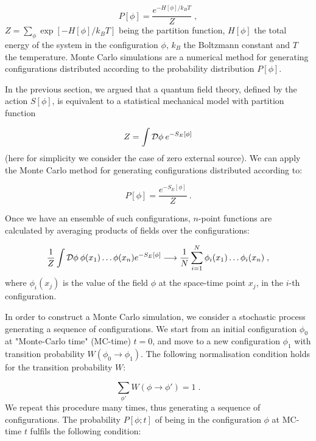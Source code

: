\begin{equation}
P[\phi] = \frac{e^{-H[\phi]/k_B T}}{Z} \; ,
\end{equation}
%
$Z=\sum_{\phi} \exp[-H[\phi]/k_B T]$ being the partition function, $H[\phi]$ the total energy of the system in the configuration $\phi$, $k_B$ the Boltzmann constant and $T$ the temperature. Monte Carlo simulations are a numerical method for generating configurations distributed according to the probability distribution $P[\phi]$.

In the previous section, we argued that a quantum field theory, defined by the action $
S[\phi]$, is equivalent to a statistical mechanical model with partition function

\begin{equation}
Z = \int \mathcal D \phi \: e^{- S_E[\phi]}
\end{equation}
%
(here for simplicity we consider the case of zero external source). We can apply the Monte Carlo method for generating configurations distributed according to:

\begin{equation}
P[\phi] = \frac{e^{-S_E[\phi]}}{Z} \: .
\label{Boltz_dist}
\end{equation}


Once we have an ensemble of such configurations, $n$-point functions are calculated by averaging products of fields over the configurations:

\begin{equation}
\frac{1}{Z} \int \mathcal D \phi \: \phi(x_1) \dots \phi(x_n) e^{ -S_E[\phi]} \longrightarrow \frac{1}{N}\sum_{i=1}^N \phi_i(x_1) \dots \phi_i(x_n) \; ,
\label{n_point_f}
\end{equation}
%
where $\phi_i(x_j)$ is the value of the field $\phi$ at the space-time point $x_j$, in the $i$-th configuration. 


In order to construct a Monte Carlo simulation, we consider a stochastic process generating a sequence of configurations.  We start from an initial configuration $\phi_0$ at "Monte-Carlo time" (MC-time) $t = 0$, and move to a new configuration $\phi_1$ with transition probability $W(\phi_0 \to \phi_1)$. The following normalisation condition holds for the transition probability $W$:

\begin{equation}
\sum_{\phi'} W(\phi \to \phi') = 1 \; .
\label{prob_norm}
\end{equation}
%
We repeat this procedure many times, thus generating a sequence of configurations. The probability $P[\phi; t]$ of being in the configuration $\phi$ at MC-time $t$ fulfils the following condition:

